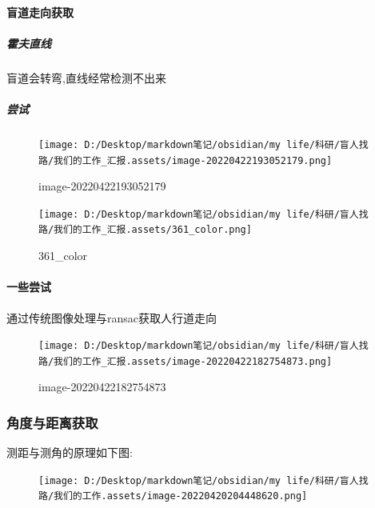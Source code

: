 \documentclass[]{article}
\let\oldparagraph\paragraph
\renewcommand{\paragraph}[1]{\oldparagraph{#1}\mbox{}}
\let\oldsubparagraph\subparagraph
\renewcommand{\subparagraph}[1]{\oldsubparagraph{#1}\mbox{}}
\begin{document}
\hypertarget{ux76f2ux9053ux8d70ux5411ux83b7ux53d6}{%
\paragraph{盲道走向获取}\label{ux76f2ux9053ux8d70ux5411ux83b7ux53d6}}

\hypertarget{ux970dux592bux76f4ux7ebf}{%
\subparagraph{霍夫直线}\label{ux970dux592bux76f4ux7ebf}}

盲道会转弯,直线经常检测不出来

\hypertarget{ux5c1dux8bd5-1}{%
\subparagraph{尝试}\label{ux5c1dux8bd5-1}}

\begin{figure}
\centering
\texttt{[image: D:/Desktop/markdown笔记/obsidian/my life/科研/盲人找路/我们的工作\_汇报.assets/image-20220422193052179.png]}
\caption{image-20220422193052179}
\end{figure}

\begin{figure}
\centering
\texttt{[image: D:/Desktop/markdown笔记/obsidian/my life/科研/盲人找路/我们的工作\_汇报.assets/361\_color.png]}
\caption{361\_color}
\end{figure}

\hypertarget{ux4e00ux4e9bux5c1dux8bd5}{%
\paragraph{一些尝试}\label{ux4e00ux4e9bux5c1dux8bd5}}

通过传统图像处理与ransac获取人行道走向

\begin{figure}
\centering
\texttt{[image: D:/Desktop/markdown笔记/obsidian/my life/科研/盲人找路/我们的工作\_汇报.assets/image-20220422182754873.png]}
\caption{image-20220422182754873}
\end{figure}

\hypertarget{ux89d2ux5ea6ux4e0eux8dddux79bbux83b7ux53d6}{%
\subsubsection{角度与距离获取}\label{ux89d2ux5ea6ux4e0eux8dddux79bbux83b7ux53d6}}

测距与测角的原理如下图:

\begin{figure}
\centering
\texttt{[image: D:/Desktop/markdown笔记/obsidian/my life/科研/盲人找路/我们的工作.assets/image-20220420204448620.png]}
\caption{}
\end{figure}
\end{document}
